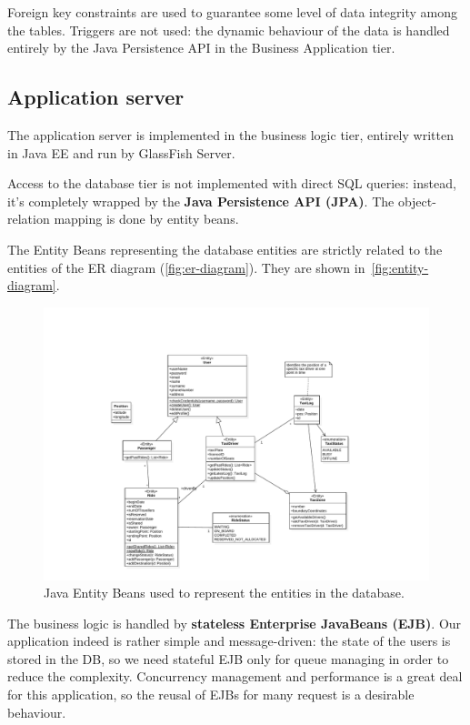 Foreign key constraints are used to guarantee some level of data integrity among the tables.
Triggers are not used: the dynamic behaviour of the data is handled entirely by the Java Persistence API in the Business Application tier.

\subsection{Application server}
The application server is implemented in the business logic tier, entirely written in Java EE and run by GlassFish Server.

Access to the database tier is not implemented with direct SQL queries: instead, it's completely wrapped by the \textbf{Java Persistence API (JPA)}. The object-relation mapping is done by entity beans.

The Entity Beans representing the database entities are strictly related to the entities of the ER diagram (\autoref{fig:er-diagram}). They are shown in~\autoref{fig:entity-diagram}.

\begin{figure}
    \centering
    \includegraphics[width=\textwidth]{diagrams/entity_diagram}
    \caption{Java Entity Beans used to represent the entities in the database.}
    \label{fig:entity-diagram}
\end{figure}

The business logic is handled by \textbf{stateless Enterprise JavaBeans (EJB)}.
Our application indeed is rather simple and message-driven: the state of the users is stored in the DB, so we need stateful EJB only for queue managing in order to reduce the complexity.
Concurrency management and performance is a great deal for this application, so the reusal of EJBs for many request is a desirable behaviour.

